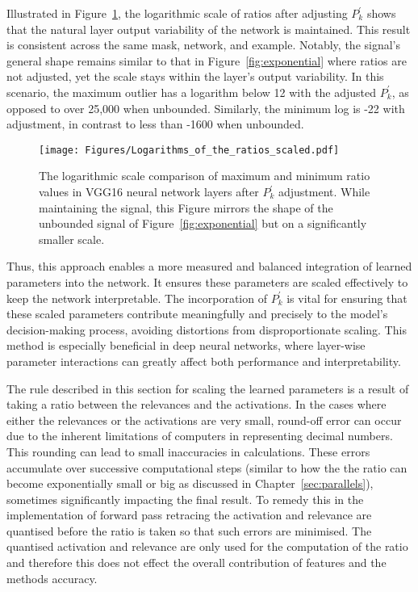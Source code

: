 Illustrated in Figure~\ref{fig:scaled}, the logarithmic scale of ratios after adjusting \(P_{k}^\prime\) shows that the natural layer output variability of the network is maintained. This result is consistent across the same mask, network, and example. Notably, the signal's general shape remains similar to that in Figure~\ref{fig:exponential} where ratios are not adjusted, yet the scale stays within the layer’s output variability. In this scenario, the maximum outlier has a logarithm below 12 with the adjusted \(P_{k}^\prime\), as opposed to over 25,000 when unbounded. Similarly, the minimum log is -22 with adjustment, in contrast to less than -1600 when unbounded.

\begin{figure}[ht!]
	\begin{center}
		\texttt{[image: Figures/Logarithms\_of\_the\_ratios\_scaled.pdf]}
	\end{center}
	\caption{The logarithmic scale comparison of maximum and minimum ratio values in VGG16 neural network layers after \(P_{k}^\prime\) adjustment. While maintaining the signal, this Figure mirrors the shape of the unbounded signal of Figure~\ref{fig:exponential}  but on a significantly smaller scale.}
	\label{fig:scaled}
\end{figure}

Thus, this approach enables a more measured and balanced integration of learned parameters into the network. It ensures these parameters are scaled effectively to keep the network interpretable. The incorporation of \(P_{k}^\prime\) is vital for ensuring that these scaled parameters contribute meaningfully and precisely to the model's decision-making process, avoiding distortions from disproportionate scaling. This method is especially beneficial in deep neural networks, where layer-wise parameter interactions can greatly affect both performance and interpretability.

The rule described in this section for scaling the learned parameters is a result of taking a ratio between the relevances and the activations. In the cases where either the relevances or the activations are very small, round-off error can occur due to the inherent limitations of computers in representing decimal numbers. This rounding can lead to small inaccuracies in calculations. These errors accumulate over successive computational steps (similar to how the the ratio can become exponentially small or big as discussed in Chapter~\ref{sec:parallels}), sometimes significantly impacting the final result. To remedy this in the implementation of forward pass retracing the activation and relevance are quantised before the ratio is taken so that such errors are minimised. The quantised activation and relevance are only used for the computation of the ratio and therefore this does not effect the overall contribution of features and the methods accuracy.

